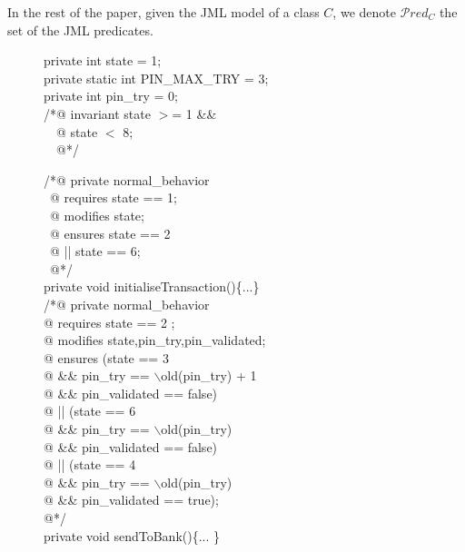 In the rest of the paper, given the JML model of a class $C$, we denote 
\(\mathcal{P}red_C\) the set of the JML predicates.








\begin{figure}[h]
\begin{multicols}{2}
\begin{scriptsize}
\ttfamily

            private int state = 1;\\
            private static  int PIN\_MAX\_TRY = 3;\\
            private int pin\_try = 0;\\
           /*@ invariant state $>$= 1 \&\&\\
           ~~@ state $<$ 8;\\
           ~~@*/


            /*@ private normal\_behavior\\
~\quad         @ requires state == 1;\\
~\quad         @ modifies state;\\
~\quad         @ ensures  state == 2 \\
~\quad         @     ||  state == 6;\\
~\quad         @*/\\
            private void initialiseTransaction()\{...\}\\
           
            /*@ private  normal\_behavior\\
\quad         @ requires state == 2 ;\\
\quad         @ modifies state,pin\_try,pin\_validated;\\
\quad         @ ensures  (state == 3 \\
\quad         @ \qquad                \&\& pin\_try == $\backslash$old(pin\_try) + 1\\
\quad         @ \qquad                \&\& pin\_validated == false) \\
\quad         @ \quad     ||   (state == 6 \\
\quad         @ \qquad                \&\& pin\_try == $\backslash$old(pin\_try)\\
\quad         @ \qquad               \&\& pin\_validated == false)\\
\quad         @ \quad    ||   (state == 4 \\
\quad         @ \qquad               \&\& pin\_try == $\backslash$old(pin\_try)\\
\quad         @ \qquad               \&\& pin\_validated == true);\\
\quad         @*/\\
            private void sendToBank()\{... \}\\
            

\end{scriptsize}
\end{multicols}
\end{figure}
